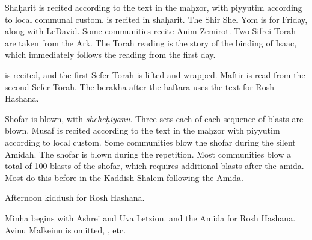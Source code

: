 {Sha\d{h}arit is recited according to the text in the ma\d{h}zor, with piyyutim according to local communal custom.  is recited in sha\d{h}arit. The Shir Shel Yom is for Friday, along with LeDavid.  Some communities recite Anim Zemirot.  Two Sifrei Torah are taken from the Ark.  The Torah reading is the story of the binding of Isaac, which immediately follows the reading from the first day.

\leinRoshHashanaII

\halfkad\space is recited, and the first Sefer Torah is lifted and wrapped. Maftir is read from the second Sefer Torah. \haftRoshHashanaII The berakha after the haftara uses the text for Rosh Hashana.

Shofar is blown, with \textit{shehe\d{h}iyanu}. Three sets each of each sequence of blasts are blown.  Musaf is recited according to the text in the ma\d{h}zor with piyyutim according to local custom. Some communities blow the shofar during the silent Amidah.  The shofar is blown during the repetition.  Most communities blow a total of 100 blasts of the shofar, which requires additional blasts after the amida.  Most do this before  in the Kaddish Shalem following the Amida.

Afternoon kiddush for Rosh Hashana.

Min\d{h}a begins with Ashrei and Uva Letzion. \halfkad\space and the Amida for Rosh Hashana. Avinu Malkeinu is omitted, \fullkad , etc.
}

\newcommand{\tzomGedalia}[3]{
\textbf{Tzom Gedalia \textendash\space #3 Tishrei}

The Third of Tishrei is a minor fast, commemoratting the assassination of Gedalia, the governor of the Babylonian province of Judea.  His assassination ended the last Jewish governance that had remained after the destruction of the First Temple. It also is part of the fasting of the Yamim Noraim season, which formerly included days of fasting. #2

Seli\d{h}ot are recited (before sha\d{h}arit, as during the 10 Days of Repentence). Additions to the Amidah for both minor fasts and the 10 Days of Repentence are included. Avinu Malkeinu is read, using the text for the 10 Days of Repentence.

\leinminorfast

Psalm of the day for #1 and Ledavid.

Min\d{h}a is said with the same Torah reading as sha\d{h}arit, except that the third aliya is called as Maftir. \haftTzomMincha The Amidah is recited, with additions for the Ten Days of Repentence and minor fasts. Avinu Malkeinu is recited, with the text for the 10 Days of Repentence.
}

